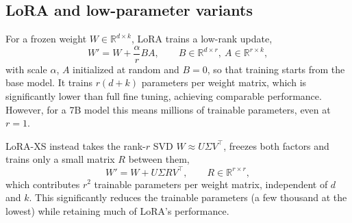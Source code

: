 \documentclass[twoside]{article}
\newcommand{\mcN}{\mathcal{N}}
\newcommand{\mbR}{\mathbb{R}}
\newcommand{\mbE}{\mathbb{E}}
\begin{document}
\subsection{LoRA and low-parameter variants}
For a frozen weight $W \in \mbR^{d \times k}$, LoRA \citep{hu2022lora} trains a low-rank update,
\begin{equation}
    W' = W + \frac{\alpha}{r} B A, \qquad B \in \mbR^{d \times r},\ A \in \mbR^{r \times k},
    \label{eq:lora}
\end{equation}
with scale $\alpha$, $A$ initialized at random and $B = 0$, so that training starts from the base model. It trains $r(d + k)$ parameters per weight matrix, which is significantly lower than full fine tuning, achieving comparable performance.
However, for a 7B model this means millions of trainable parameters, even at $r = 1$.

LoRA-XS \citep{balazy2024loraxs} instead takes the rank-$r$ SVD $W \approx U \Sigma V^\top$, freezes both factors and trains only a small matrix $R$ between them,
\begin{equation}
    W' = W + U \Sigma R V^\top, \qquad R \in \mbR^{r \times r},
    \label{eq:loraxs}
\end{equation}
which contributes $r^2$ trainable parameters per weight matrix, independent of $d$ and $k$.
This significantly reduces the trainable parameters (a few thousand at the lowest) while retaining much of LoRA's performance.
\end{document}
